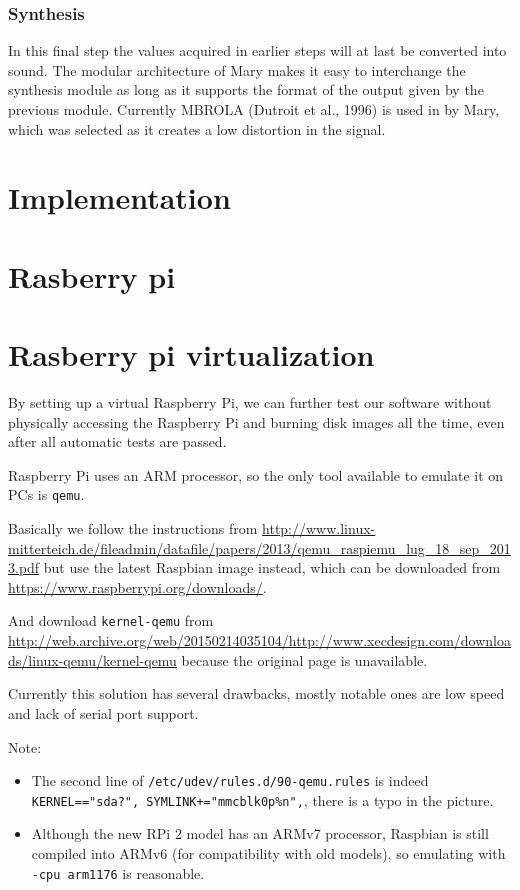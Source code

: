 \documentclass[a4paper, 12pt]{article}
\begin{document}
\subsubsection*{Synthesis}
In this final step the values acquired in earlier steps will at last be converted into sound.
The modular architecture of Mary makes it easy to interchange the synthesis module as long as it supports the format of the output given by the previous module.
Currently MBROLA (Dutroit et al., 1996) is used in by Mary, which was selected as it creates a low distortion in the signal.

\newpage
\section{Implementation}
\section{Rasberry pi} 
\section{Rasberry pi virtualization}
By setting up a virtual Raspberry Pi, we can further test our software without physically accessing the Raspberry Pi and burning disk images all the time, even after all automatic tests are passed.


Raspberry Pi uses an ARM processor, so the only tool available to emulate it on PCs is \texttt{qemu}.

Basically we follow the instructions from \url{http://www.linux-mitterteich.de/fileadmin/datafile/papers/2013/qemu_raspiemu_lug_18_sep_2013.pdf} but use the latest Raspbian image instead, which can be downloaded from \url{https://www.raspberrypi.org/downloads/}.

And download \texttt{kernel-qemu} from \url{http://web.archive.org/web/20150214035104/http://www.xecdesign.com/downloads/linux-qemu/kernel-qemu} because the original page is unavailable.

Currently this solution has several drawbacks, mostly notable ones are low speed and lack of serial port support.

\vspace{\baselineskip}

Note:

\begin{itemize}
\item The second line of \texttt{/etc/udev/rules.d/90-qemu.rules} is indeed \texttt{KERNEL=="sda?", SYMLINK+="mmcblk0p\%n",}, there is a typo in the picture.
\item Although the new RPi 2 model has an ARMv7 processor, Raspbian is still compiled into ARMv6 (for compatibility with old models), so emulating with \texttt{-cpu arm1176} is reasonable.
\end{itemize}
\end{document}
